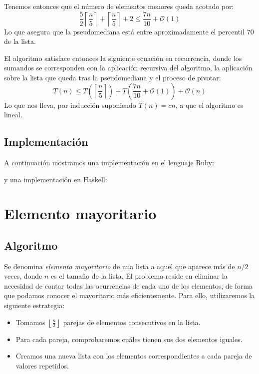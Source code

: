 \documentclass[a4paper, 11pt]{article} %
\begin{document}
      Tenemos entonces que el número de elementos menores queda acotado por:
      \begin{equation}
       \frac{5}{2} \left\lceil \frac{n}{5} \right\rceil + \left\lceil \frac{n}{5} \right\rceil + 2 \leq \frac{7n}{10} + \mathcal{O}(1) 
      \end{equation}
      Lo que asegura que la pseudomediana está entre aproximadamente el percentil $70$ de la lista.
      
      El algoritmo satisface entonces la siguiente ecuación en recurrencia, donde los sumandos se corresponden con la aplicación
      recursiva del algoritmo, la aplicación sobre la lista que queda tras la pseudomediana y el proceso de pivotar:
      \begin{equation}
       T(n) \leq T\left(\left\lceil \frac{n}{5} \right\rceil \right) + T\left(\frac{7n}{10} + \mathcal{O}(1) \right) + \mathcal{O}(n)
      \end{equation}
      Lo que nos lleva, por inducción suponiendo $T(n) = cn$, a que el algoritmo es lineal.
      
\subsection{Implementación}
A continuación mostramos una implementación en el lenguaje Ruby:

\small
\texttt{}
\normalsize

y una implementación en Haskell:

\small
\texttt{}
\normalsize


\section {Elemento mayoritario}
\subsection{Algoritmo}
Se denomina \textit{elemento mayoritario} de una lista a aquel que aparece más de $n/2$ veces, donde $n$ es el tamaño de la lista.
El problema reside en eliminar la necesidad de contar todas las ocurrencias de cada uno de los elementos, de forma que podamos conocer el mayoritario más eficientemente.
Para ello, utilizaremos la siguiente estrategia:

\begin{itemize}
\item Tomamos $\left\lfloor\frac{n}{2}\right\rfloor$ parejas de elementos consecutivos en la lista.
\item Para cada pareja, comprobaremos cuáles tienen sus dos elementos iguales.
\item Creamos una nueva lista con los elementos correspondientes a cada pareja de valores repetidos.
\end{itemize}
\end{document}
